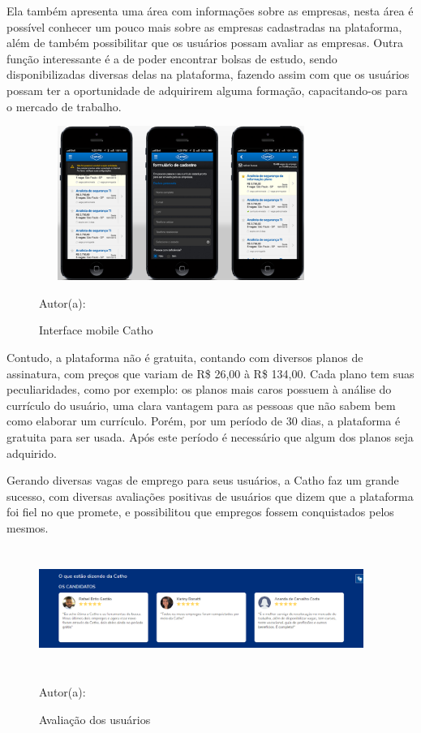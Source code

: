 Ela também apresenta uma área com informações sobre as empresas, nesta área é possível conhecer um pouco mais sobre as empresas cadastradas na plataforma, além de também possibilitar que os usuários possam avaliar as empresas. Outra função interessante é a de poder encontrar bolsas de estudo, sendo disponibilizadas diversas delas na plataforma, fazendo assim com que os usuários possam ter a oportunidade de adquirirem alguma formação, capacitando-os para o mercado de trabalho.


\begin{figure}[!h]
	\centering
	\caption{Interface mobile Catho}
	\includegraphics[width=350px, height=190px]{./images/cathoMobile.png}
	\par {Autor(a): \cite{catho}}
\end{figure}

\newpage

Contudo, a plataforma não é gratuita, contando com diversos planos de assinatura, com preços que variam de R\$ 26,00 à R\$ 134,00. Cada plano tem suas peculiaridades, como por exemplo: os planos mais caros possuem à análise do currículo do usuário, uma clara vantagem para as pessoas que não sabem bem como elaborar um currículo. Porém, por um período de 30 dias, a plataforma é gratuita para ser usada. Após este período é necessário que algum dos planos seja adquirido.

Gerando diversas vagas de emprego para seus usuários, a Catho faz um grande sucesso, com diversas avaliações positivas de usuários que dizem que a plataforma foi fiel no que promete, e possibilitou que empregos fossem conquistados pelos mesmos.

\begin{figure}[!h]
	\centering
	\caption{Avaliação dos usuários}
	\includegraphics[width=400px, height=150px]{./images/cathoMobile1.png}
	\par {Autor(a): \cite{catho-3}}
\end{figure}


